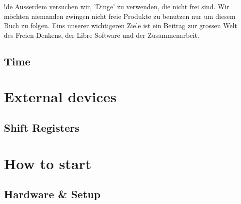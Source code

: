 \documentclass[twoside,12pt,authoryear,openright,a4paper]{book}
\begin{document}
!de Ausserdem versuchen wir, 'Dinge' zu verwenden, die nicht frei sind. Wir möchten niemanden zwingen nicht freie Produkte zu benutzen nur um diesem Buch zu folgen. Eins unserer wichtigeren Ziele ist ein Beitrag zur grossen Welt des Freien Denkens, der Libre Software und der Zusammenarbeit.










\chapter{Time}




\part{External devices}

\chapter{Shift Registers}




\part{How to start}

\chapter{Hardware & Setup}


\end{document}
